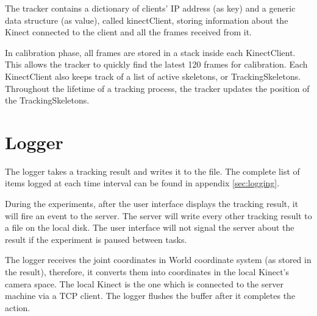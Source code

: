 The tracker contains a dictionary of clients' IP address (as key) and a generic data structure (as value), called kinectClient, storing information about the Kinect connected to the client and all the frames received from it.

In calibration phase, all frames are stored in a stack inside each KinectClient. This allows the tracker to quickly find the latest 120 frames for calibration. Each KinectClient also keeps track of a list of active skeletons, or TrackingSkeletons. Throughout the lifetime of a tracking process, the tracker updates the position of the TrackingSkeletons.

\section{Logger}
\label{sec:implementation_logger}

The logger takes a tracking result and writes it to the file. The complete list of items logged at each time interval can be found in appendix \ref{sec:logging}.

During the experiments, after the user interface displays the tracking result, it will fire an event to the server. The server will write every other tracking result to a file on the local disk. The user interface will not signal the server about the result if the experiment is paused between tasks.

The logger receives the joint coordinates in World coordinate system (as stored in the result), therefore, it converts them into coordinates in the local Kinect's camera space. The local Kinect is the one which is connected to the server machine via a TCP client. The logger flushes the buffer after it completes the action.


